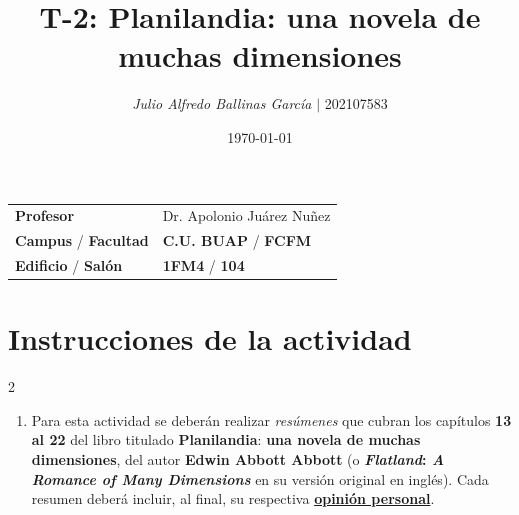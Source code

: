 \documentclass{article}
\title{ \textcolor{Tarawera}{\textbf{T-\textcolor{Sun}{\textbf{2}}}}: \textcolor{Apple Green}{\textbf{\textcolor{orange(colorwheel)}{\textbf{Planilandia}}: una novela de muchas dimensiones}}}
\author{\emph{Julio Alfredo Ballinas García} $\boldsymbol{\mid}$ 202107583}
\date{\today}
\begin{document}
\maketitle



\begin{mybox}
	\noindent\begin{tabular}{@{}ll}
		{\bfseries{Profesor}} & Dr. Apolonio Juárez Nuñez\\
		\textcolor{prussianblue}{\bfseries{Campus}} / \textcolor{trueblue}{\bfseries{Facultad}}  & \textcolor{prussianblue}{\bfseries{C.U. BUAP}} /  \textcolor{trueblue}{\bfseries{FCFM}} \\
		\textcolor{prussianblue}{\bfseries{Edificio}} /  \textcolor{trueblue}{\bfseries{Salón}}    & 	\textcolor{prussianblue}{\bfseries{1FM4}} /  \textcolor{trueblue}{\bfseries{104}}   
	\end{tabular} 
\end{mybox} \vspace{1cm}

\section*{Instrucciones de la actividad}

\setlength{\columnsep}{2cm}
\begin{multicols}{2} %
	\begin{enumerate}[label={{\textcolor{trueblue}{\textbf{Ej}. \arabic*.0}}}, start=1]
	\item Para esta actividad se deberán realizar \emph{resúmenes} que cubran los capítulos \textbf{13 al 22} del libro titulado 
\textcolor{orange(colorwheel)}{\textbf{Planilandia}}: 
\textcolor{Apple Green}{\textbf{una novela de muchas dimensiones}}, del autor \textbf{Edwin Abbott Abbott} 
(o \textbf{\emph{Flatland}: \emph{A Romance of Many Dimensions}} en su versión original en inglés).  
Cada resumen deberá incluir, al final, su respectiva \underline{\textbf{opinión personal}}.
	\end{enumerate}
\end{multicols} 

\vspace{2cm}


\tableofcontents  \vspace{2cm}
\end{document}
